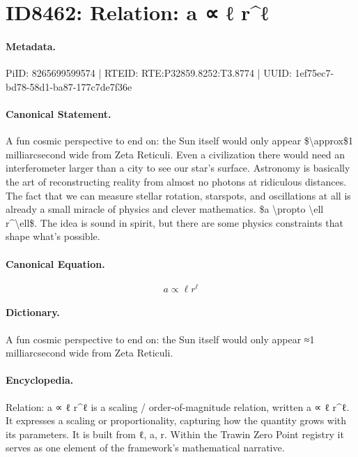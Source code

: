 \section*{ID8462: Relation: a ∝ ℓ r\textasciicircum{}ℓ}
\paragraph{Metadata.}
PiID: 8265699599574 | RTEID: RTE:P32859.8252:T3.8774 | UUID: 1ef75ec7-bd78-58d1-ba87-177c7de7f36e

\paragraph{Canonical Statement.}
A fun cosmic perspective to end on: the Sun itself would only appear \$\textbackslash{}approx\$1 milliarcsecond wide from Zeta Reticuli. Even a civilization there would need an interferometer larger than a city to see our star’s surface. Astronomy is basically the art of reconstructing reality from almost no photons at ridiculous distances. The fact that we can measure stellar rotation, starspots, and oscillations at all is already a small miracle of physics and clever mathematics. \$a \textbackslash{}propto \textbackslash{}ell r\textasciicircum{}\textbackslash{}ell\$. The idea is sound in spirit, but there are some physics constraints that shape what’s possible.

\paragraph{Canonical Equation.}
\[
a \propto \ell r^\ell
\]

\paragraph{Dictionary.}
A fun cosmic perspective to end on: the Sun itself would only appear ≈1 milliarcsecond wide from Zeta Reticuli.

\paragraph{Encyclopedia.}
Relation: a ∝ ℓ r\textasciicircum{}ℓ is a scaling / order-of-magnitude relation, written a ∝ ℓ r\textasciicircum{}ℓ. It expresses a scaling or proportionality, capturing how the quantity grows with its parameters. It is built from ℓ, a, r. Within the Trawin Zero Point registry it serves as one element of the framework's mathematical narrative.
